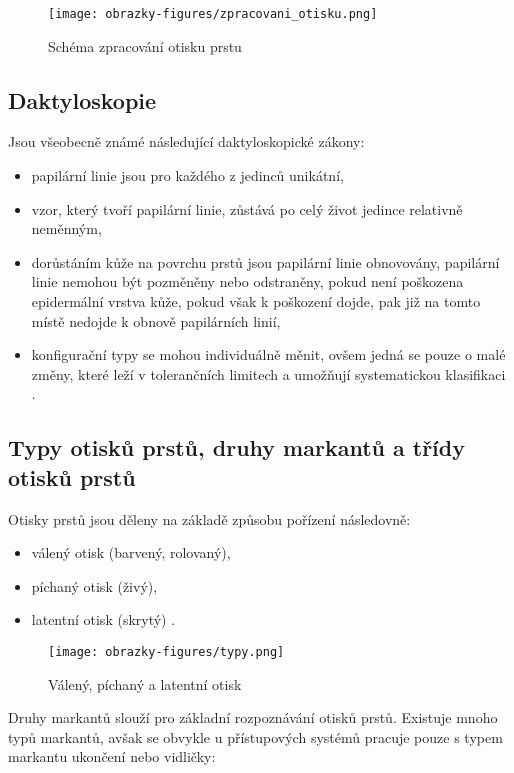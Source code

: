 \begin{figure}[!htbp]
    \centering
    \texttt{[image: obrazky-figures/zpracovani\_otisku.png]}
    \caption{Schéma zpracování otisku prstu \cite{BIOopora}}
    \label{fig:zpracovani}
\end{figure}

\subsection*{Daktyloskopie}
Jsou všeobecně známé následující daktyloskopické zákony:
\begin{itemize}
    \item papilární linie jsou pro každého z jedinců unikátní,
    \item vzor, který tvoří papilární linie, zůstává po celý život jedince relativně neměnným, 
    \item dorůstáním kůže na povrchu prstů jsou papilární linie obnovovány, papilární linie nemohou být pozměněny nebo odstraněny, pokud není poškozena epidermální vrstva kůže, pokud však k poškození dojde, pak již na tomto místě nedojde k obnově papilárních linií,
    \item konfigurační typy se mohou individuálně měnit, ovšem jedná se pouze o malé změny, které leží v tolerančních limitech a umožňují systematickou klasifikaci \cite{BIOopora}.
\end{itemize}
\subsection*{Typy otisků prstů, druhy markantů a třídy otisků prstů}
Otisky prstů jsou děleny na základě způsobu pořízení následovně:
\begin{itemize}
\item válený otisk (barvený, rolovaný),
\item píchaný otisk (živý),
\item latentní otisk (skrytý) \cite{BIOopora}.
\end{itemize}

\begin{figure}[!htbp]
    \centering
    \texttt{[image: obrazky-figures/typy.png]}
    \caption{Válený, píchaný a latentní otisk \cite{BIOopora}}
\end{figure}

Druhy markantů slouží pro základní rozpoznávání otisků prstů. Existuje mnoho typů markantů, avšak se obvykle u přístupových systémů pracuje pouze s typem markantu ukončení nebo vidličky:


